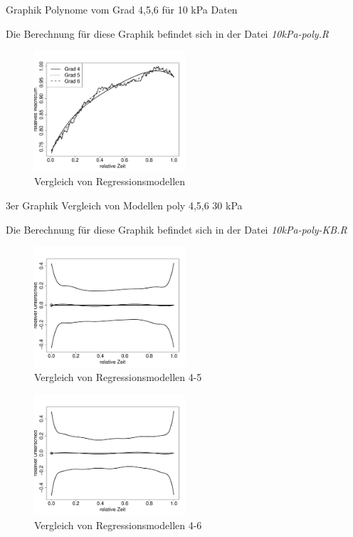 \documentclass[12pt,a4paper]{article}
\theoremstyle{definition}
\theoremstyle{definition}
\theoremstyle{definition}
\theoremstyle{definition}
\begin{document}
Graphik Polynome vom Grad 4,5,6 für 10 kPa Daten

Die Berechnung für diese Graphik befindet sich in der Datei \textit{10kPa-poly.R}

\begin{figure}[H] 
  \centering
     \includegraphics[width=0.5\textwidth]{10kPa-poly.pdf}
  \caption{Vergleich von Regressionsmodellen}
  \label{fig:13}
\end{figure}

3er Graphik Vergleich von Modellen poly 4,5,6 30 kPa

Die Berechnung für diese Graphik befindet sich in der Datei \textit{10kPa-poly-KB.R}

\begin{figure}[H] 
  \centering
     \includegraphics[width=0.5\textwidth]{10kPa-poly-KB-4-5.pdf}
  \caption{Vergleich von Regressionsmodellen 4-5}
  \label{fig:14}
\end{figure}

\begin{figure}[H] 
  \centering
     \includegraphics[width=0.5\textwidth]{10kPa-poly-KB-4-6.pdf}
  \caption{Vergleich von Regressionsmodellen 4-6}
  \label{fig:14.1}
\end{figure}
\end{document}
